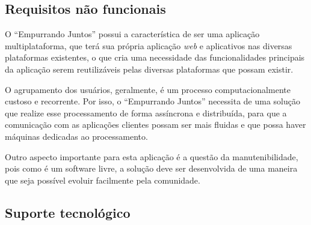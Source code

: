	  
      
    \subsection*{Requisitos não funcionais}	\label{non_functional_requirements}
    
    O ``Empurrando Juntos'' possui a característica de ser uma aplicação multiplataforma,
    que terá sua própria aplicação \textit{web} e aplicativos nas diversas plataformas existentes,
    o que cria uma necessidade das funcionalidades principais da aplicação serem reutilizáveis
    pelas diversas plataformas que possam existir.
    
    O agrupamento dos usuários, geralmente, é um processo computacionalmente custoso e recorrente. Por isso, o ``Empurrando Juntos''
    necessita de uma solução que realize esse processamento de forma assíncrona e distribuída, para que a comunicação com
    as aplicações clientes possam ser mais fluidas e que possa haver máquinas dedicadas ao processamento.
    
    Outro aspecto importante para esta aplicação é a questão da manutenibilidade, pois como é um software livre, a solução
    deve ser desenvolvida de uma maneira que seja possível evoluir facilmente pela comunidade.
    
    \subsection*{Suporte tecnológico}
    

